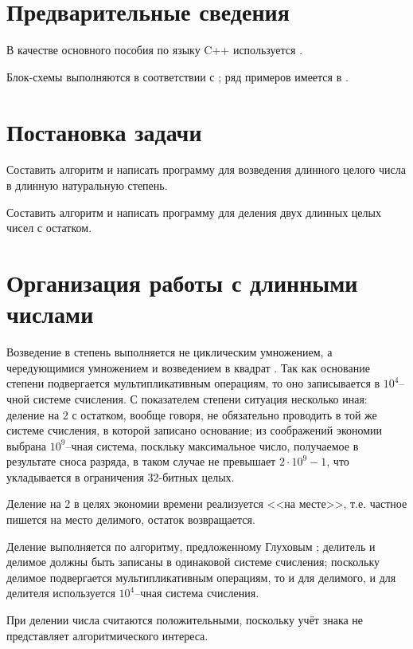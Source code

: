 \documentclass[a4paper,12pt]{article} %
\begin{document}
\setcounter{page}{2}

\section*{Предварительные сведения}

В качестве основного пособия по языку C++ используется \cite{chmyhalo}.


Блок-схемы выполняются в соответствии с \cite{gost-block-scheme};
ряд примеров имеется в \cite{wiki-block-scheme}.


\section*{Постановка задачи}
Составить алгоритм и написать программу
для возведения длинного целого числа в длинную натуральную степень.

Составить алгоритм и написать программу
для деления двух длинных целых чисел с остатком.

\section*{Организация работы с длинными числами}

Возведение в степень выполняется не циклическим умножением,
а чередующимися умножением и возведением в квадрат \cite{Glukhov}.
Так как основание степени подвергается мультипликативным операциям,
то оно записывается в $10^4$--чной системе счисления.
С показателем степени ситуация несколько иная:
деление на 2 с остатком, вообще говоря,
не обязательно проводить в той же системе счисления, в которой записано основание;
из соображений экономии выбрана $10^9$--чная система,
поскльку максимальное число, получаемое в результате сноса разряда,
в таком случае не превышает $2\cdot 10^9 - 1$,
что укладывается в ограничения 32-битных целых.

Деление на 2 в целях экономии времени реализуется <<на месте>>,
т.е. частное пишется на место делимого, остаток возвращается.

Деление выполняется по алгоритму, предложенному Глуховым \cite{Glukhov};
делитель и делимое должны быть записаны в одинаковой системе счисления;
поскольку делимое подвергается мультипликативным операциям,
то и для делимого, и для делителя используется $10^4$--чная система счисления.

При делении числа считаются положительными,
поскольку учёт знака не представляет алгоритмического интереса.
\end{document}
